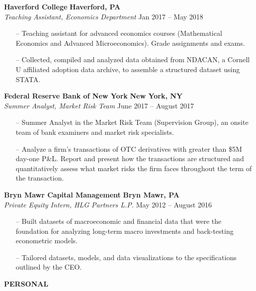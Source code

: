 \documentclass[paper=a4, fontsize=11pt]{scrartcl} %
\newcommand{\I}{--}
\newenvironment{mycenter}[1][\topsep]
  {\setlength{\topsep}{#1}\par\kern\topsep\centering}%
  {\par\kern\topsep}%
\begin{document}
\textbf{Haverford College} \hfill \textbf{Haverford, PA}\\
\textit{Teaching Assistant, Economics Department}
\hfill Jan 2017 -- May 2018
\begin{itemize}[topsep=0pt,noitemsep]
  \item[\I] Teaching assistant for advanced economics courses (Mathematical Economics and Advanced Microeconomics). Grade assignments and exams. 
  \item[\I] Collected, compiled and analyzed data obtained from NDACAN, a Cornell U affiliated adoption data
archive, to assemble a structured dataset using STATA.
\end{itemize}

\vspace{1mm}

\textbf{Federal Reserve Bank of New York} \hfill \textbf{New York, NY} \\
\textit{Summer Analyst, Market Risk Team} \hfill June 2017 -- August 2017
\begin{itemize}[topsep=0pt,noitemsep]
	\item[\I] Summer Analyst in the Market Risk Team (Supervision Group), an onsite team of bank examiners and
market risk specialists. 
	\item[\I] Analyze a firm's transactions of OTC derivatives with greater than \$5M day-one P\&L. Report and present
how the transactions are structured and quantitatively assess what market risks the firm faces throughout the term of the
transaction.
\end{itemize}

\textbf{Bryn Mawr Capital Management} \hfill \textbf{Bryn Mawr, PA} \\
\textit{Private Equity Intern, HLG Partners L.P.} \hfill May 2012 -- August 2016
\begin{itemize}[topsep=0pt,noitemsep]
	\item[\I] Built datasets of macroeconomic and financial data that were the foundation for
analyzing long-term macro investments and back-testing econometric models.
	\item[\I] Tailored datasets, models, and data visualizations to the specifications outlined by the CEO.

\end{itemize}

\vspace{2mm}

\begin{mycenter}[0pt]
\textsc{\textbf{PERSONAL}}
\end{mycenter}
\end{document}
